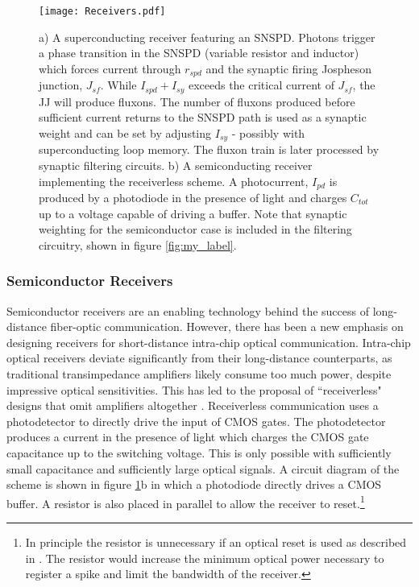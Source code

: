\documentclass[twocolumn]{article}
\begin{document}
\begin{figure}
    \centering
    \texttt{[image: Receivers.pdf]}
    \caption{a) A superconducting receiver featuring an SNSPD. Photons trigger a phase transition in the SNSPD (variable resistor and inductor) which forces current through $r_{spd}$ and the synaptic firing Jospheson junction, $J_{sf}$. While $I_{spd} + I_{sy}$ exceeds the critical current of $J_{sf}$, the JJ will produce fluxons. The number of fluxons produced before sufficient current returns to the SNSPD path is used as a synaptic weight and can be set by adjusting $I_{sy}$ - possibly with superconducting loop memory. The fluxon train is later processed by synaptic filtering circuits. b) A semiconducting receiver implementing the receiverless scheme. A photocurrent, $I_{pd}$ is produced by a photodiode in the presence of light and charges $C_{tot}$ up to a voltage capable of driving a buffer. Note that synaptic weighting for the semiconductor case is included in the filtering circuitry, shown in figure \ref{fig:my_label}.}
    \label{fig:sup_synapse}
\end{figure}

\subsubsection{Semiconductor Receivers}
\quad \quad Semiconductor receivers are an enabling technology behind the success of long-distance fiber-optic communication. However, there has been a new emphasis on designing receivers for short-distance intra-chip optical communication. Intra-chip optical receivers deviate significantly from their long-distance counterparts, as traditional transimpedance amplifiers likely consume too much power, despite impressive optical sensitivities. This has led to the proposal of ``receiverless" designs that omit amplifiers altogether \cite{miller2017attojoule}. Receiverless communication uses a photodetector to directly drive the input of CMOS gates. The photodetector produces a current in the presence of light which charges the CMOS gate capacitance up to the switching voltage. This is only possible with sufficiently small capacitance and sufficiently large optical signals. A circuit diagram of the scheme is shown in figure \ref{fig:sup_synapse}b in which a photodiode directly drives a CMOS buffer. A resistor is also placed in parallel to allow the receiver to reset.\footnote{In principle the resistor is unnecessary if an optical reset is used as described in \cite{debaes2003receiver}. The resistor would increase the minimum optical power necessary to register a spike and limit the bandwidth of the receiver.}
\end{document}
